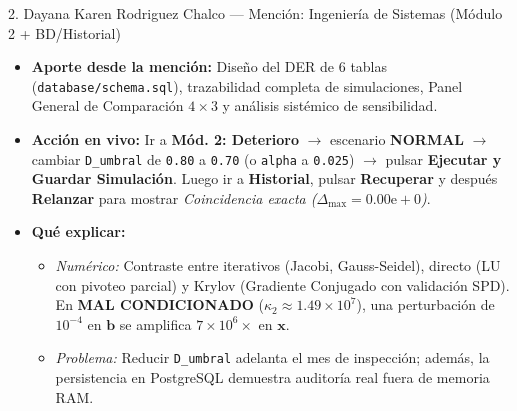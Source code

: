 \documentclass[11pt,a4paper]{article}
\begin{document}
\begin{ficha}{2. Dayana Karen Rodriguez Chalco — Mención: Ingeniería de Sistemas (Módulo 2 + BD/Historial)}
\begin{itemize}[noitemsep]
    \item \textbf{Aporte desde la mención:} Diseño del DER de 6 tablas (\texttt{database/schema.sql}), trazabilidad completa de simulaciones, Panel General de Comparación $4\times 3$ y análisis sistémico de sensibilidad.
    \item \textbf{Acción en vivo:} Ir a \textbf{Mód. 2: Deterioro} $\rightarrow$ escenario \textbf{NORMAL} $\rightarrow$ cambiar \texttt{D\_umbral} de \texttt{0.80} a \texttt{0.70} (o \texttt{alpha} a \texttt{0.025}) $\rightarrow$ pulsar \textbf{Ejecutar y Guardar Simulación}. Luego ir a \textbf{Historial}, pulsar \textbf{Recuperar} y después \textbf{Relanzar} para mostrar \textit{Coincidencia exacta ($\Delta_{\max}=0.00\text{e}+0$)}.
    \item \textbf{Qué explicar:}
    \begin{itemize}[noitemsep]
        \item \textit{Numérico:} Contraste entre iterativos (Jacobi, Gauss-Seidel), directo (LU con pivoteo parcial) y Krylov (Gradiente Conjugado con validación SPD). En \textbf{MAL CONDICIONADO} ($\kappa_2 \approx 1.49\times 10^7$), una perturbación de $10^{-4}$ en $\mathbf{b}$ se amplifica $7\times 10^6\times$ en $\mathbf{x}$.
        \item \textit{Problema:} Reducir \texttt{D\_umbral} adelanta el mes de inspección; además, la persistencia en PostgreSQL demuestra auditoría real fuera de memoria RAM.
    \end{itemize}
\end{itemize}
\end{ficha}
\end{document}
